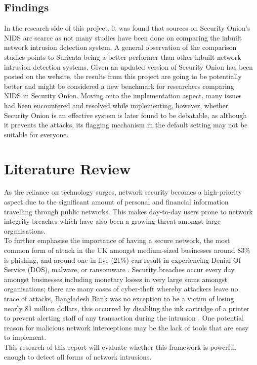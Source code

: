 \documentclass[12pt]{article}
\begin{document}
	\subsection{Findings}
	In the research side of this project, it was found that sources on Security Onion's NIDS are scarce as not many studies have been done on comparing the inbuilt network intrusion detection system. A general observation of the comparison studies points to Suricata being a better performer than other inbuilt network intrusion detection systems. Given an updated version of Security Onion has been posted on the website, the results from this project are going to be potentially better and might be considered a new benchmark for researchers comparing NIDS in Security Onion. Moving onto the implementation aspect, many issues had been encountered and resolved while implementing, however, whether Security Onion is an effective system is later found to be debatable, as although it prevents the attacks, its flagging mechanism in the default setting may not be suitable for everyone. 
	
		\section{Literature Review}
	
	As the reliance on technology surges, network security becomes a high-priority aspect due to the significant amount of personal and financial information travelling through public networks. This makes day-to-day users prone to network integrity breaches which have also been a growing threat amongst large organisations. 
	\\
	To further emphasise the importance of having a secure network, the most common form of attack in the UK amongst medium-sized businesses around 83\% is phishing, and around one in five (21\%) can result in experiencing Denial Of Service (DOS), malware, or ransomware \cite{ell_gallucci_2022}. Security breaches occur every day amongst businesses including monetary losses in very large sums amongst organisations; there are many cases of
	cyber-theft whereby attackers leave no trace of attacks, Bangladesh Bank was no exception
	to be a victim of losing nearly 81 million dollars, this occurred by disabling the ink cartridge of a printer to prevent alerting staff of any transaction during the intrusion \cite{mazumder2020spillover}.
	One potential reason for malicious network interceptions may be the lack of tools that are easy to implement.
	\\
	This research of this report will evaluate whether this framework is powerful enough to detect all forms of network intrusions.
	
\end{document}

